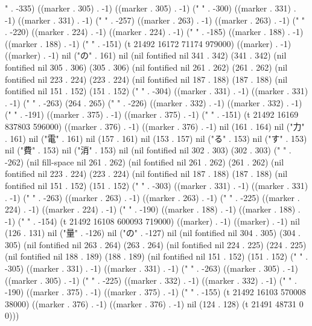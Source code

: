 " . -335) ((marker . 305) . -1) ((marker . 305) . -1) ("
" . -300) ((marker . 331) . -1) ((marker . 331) . -1) ("
" . -257) ((marker . 263) . -1) ((marker . 263) . -1) ("
" . -220) ((marker . 224) . -1) ((marker . 224) . -1) ("
" . -185) ((marker . 188) . -1) ((marker . 188) . -1) ("
" . -151) (t 21492 16172 71174 979000) ((marker) . -1) ((marker) . -1) nil ("の" . 161) nil (nil fontified nil 341 . 342) (341 . 342) (nil fontified nil 305 . 306) (305 . 306) (nil fontified nil 261 . 262) (261 . 262) (nil fontified nil 223 . 224) (223 . 224) (nil fontified nil 187 . 188) (187 . 188) (nil fontified nil 151 . 152) (151 . 152) ("
" . -304) ((marker . 331) . -1) ((marker . 331) . -1) ("
" . -263) (264 . 265) ("
" . -226) ((marker . 332) . -1) ((marker . 332) . -1) ("
" . -191) ((marker . 375) . -1) ((marker . 375) . -1) ("
" . -151) (t 21492 16169 837803 596000) ((marker . 376) . -1) ((marker . 376) . -1) nil (161 . 164) nil ("力" . 161) nil ("電" . 161) nil (157 . 161) nil (153 . 157) nil ("る" . 153) nil ("す" . 153) nil ("費" . 153) nil ("消" . 153) nil (nil fontified nil 302 . 303) (302 . 303) (" " . -262) (nil fill-space nil 261 . 262) (nil fontified nil 261 . 262) (261 . 262) (nil fontified nil 223 . 224) (223 . 224) (nil fontified nil 187 . 188) (187 . 188) (nil fontified nil 151 . 152) (151 . 152) ("
" . -303) ((marker . 331) . -1) ((marker . 331) . -1) ("
" . -263) ((marker . 263) . -1) ((marker . 263) . -1) ("
" . -225) ((marker . 224) . -1) ((marker . 224) . -1) ("
" . -190) ((marker . 188) . -1) ((marker . 188) . -1) ("
" . -154) (t 21492 16108 600093 719000) ((marker) . -1) ((marker) . -1) nil (126 . 131) nil ("量" . -126) nil ("の" . -127) nil (nil fontified nil 304 . 305) (304 . 305) (nil fontified nil 263 . 264) (263 . 264) (nil fontified nil 224 . 225) (224 . 225) (nil fontified nil 188 . 189) (188 . 189) (nil fontified nil 151 . 152) (151 . 152) ("
" . -305) ((marker . 331) . -1) ((marker . 331) . -1) ("
" . -263) ((marker . 305) . -1) ((marker . 305) . -1) ("
" . -225) ((marker . 332) . -1) ((marker . 332) . -1) ("
" . -190) ((marker . 375) . -1) ((marker . 375) . -1) ("
" . -155) (t 21492 16103 570008 38000) ((marker . 376) . -1) ((marker . 376) . -1) nil (124 . 128) (t 21491 48731 0 0)))

